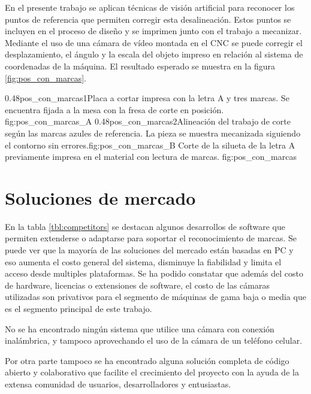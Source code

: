          En el presente trabajo se aplican técnicas de visión artificial para reconocer los puntos de referencia que permiten corregir esta desalineación.
         Estos puntos se incluyen en el proceso de diseño y se imprimen junto con el trabajo a mecanizar.
         Mediante el uso de una cámara de vídeo montada en el CNC se puede corregir el desplazamiento, el ángulo y la escala del objeto impreso en relación al sistema de coordenadas de la máquina.
         El resultado esperado se muestra en la figura \ref{fig:pos_con_marcas}.

\subfigab
         {0.48}{pos_con_marcas1}{Placa a cortar impresa con la letra A y tres marcas. Se encuentra fijada a la mesa con la fresa de corte en posición.\\ \vphantom{10}}{fig:pos_con_marcas_A}
         {0.48}{pos_con_marcas2}{Alineación del trabajo de corte según las marcas azules de referencia. La pieza se muestra mecanizada siguiendo el contorno sin errores.}{fig:pos_con_marcas_B}
         {Corte de la silueta de la letra A previamente impresa en el material con lectura de marcas. }
         {fig:pos_con_marcas}


\section{Soluciones de mercado}
   En la tabla \ref{tbl:competitors} se destacan algunos desarrollos de software que permiten extenderse o adaptarse para soportar el reconocimiento de marcas.
   Se puede ver que la mayoría de las soluciones del mercado están basadas en PC y eso aumenta el costo general del sistema, disminuye la fiabilidad y limita el acceso desde multiples plataformas.
   Se ha podido constatar que además del costo de hardware, licencias o extensiones de software, el costo de las cámaras utilizadas son privativos para el segmento de máquinas de gama baja o media que es el segmento principal de este trabajo.\par
   No se ha encontrado ningún sistema que utilice una cámara con conexión inalámbrica, y tampoco aprovechando el uso de la cámara de un teléfono celular.\par
   Por otra parte tampoco se ha encontrado alguna solución completa de código abierto y colaborativo que facilite el crecimiento del proyecto con la ayuda de la extensa comunidad de usuarios, desarrolladores y entusiastas.


